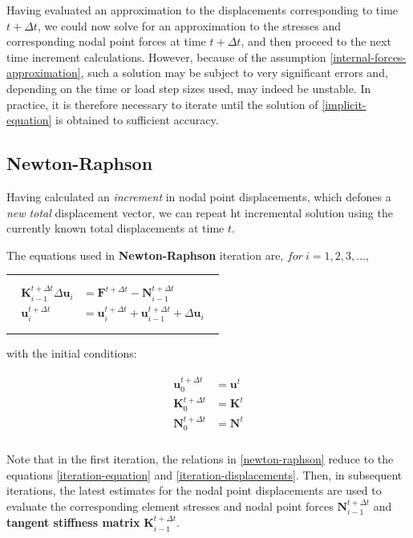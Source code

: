\documentclass[10pt,b5paper,titlepage]{book}
\newenvironment{bbox}[1][0.96]
{
    \begin{center}
        \begin{tabular}{|p{#1\textwidth}|}
            \hline\\
}
{
            \\\\\hline
        \end{tabular}
    \end{center}
}
\newenvironment{eqarray}
{
    \begin{eqnarray}
        \begin{aligned}
}
{
        \end{aligned}
    \end{eqnarray}
}
\begin{document}
Having evaluated an approximation to the displacements corresponding to
time $ t + \Delta t $, we could now solve for an approximation to the stresses and
corresponding nodal point forces at time $ t + \Delta t $, and then proceed to the
next time increment calculations. However, because of the assumption
\eqref{internal-forces-approximation}, such a solution may be subject to
very significant errors and, depending on the time or load step sizes used, may
indeed be unstable. In practice, it is therefore necessary to iterate until the
solution of \eqref{implicit-equation} is obtained to sufficient accuracy.


\subsection{Newton-Raphson}
Having calculated an \textit{increment} in nodal point displacements, which defones
a \textit{new total} displacement vector, we can repeat ht incremental solution
using the currently known total displacements at time $ t $.

The equations used in \textbf{Newton-Raphson} iteration are, $ for\ i = 1, 2, 3, \dots, $

\begin{bbox}
    \begin{eqarray}\label{newton-raphson}
        \mathbf{K}_{i-1}^{t + \Delta t} \Delta \mathbf{u}_i &=
        \mathbf{F}^{t + \Delta t} - \mathbf{N}_{i - 1}^{t + \Delta t} \\
        \mathbf{u}_{i}^{t+\Delta t} &=  \mathbf{u}_{i}^{t + \Delta t} +
        \mathbf{u}_{i-1}^{t+\Delta t} + \Delta \mathbf{u}_i
    \end{eqarray}
\end{bbox}

with the initial conditions:

\begin{eqarray}
    \mathbf{u}_{0}^{t + \Delta t} &= \mathbf{u}^t \\
    \mathbf{K}_{0}^{t + \Delta t} &= \mathbf{K}^t \\
    \mathbf{N}_{0}^{t + \Delta t} &= \mathbf{N}^t \\
\end{eqarray}

Note that in the first iteration, the relations in \eqref{newton-raphson}
reduce to the equations \eqref{iteration-equation} and \eqref{iteration-displacements}.
Then, in subsequent iterations, the latest estimates for the nodal point
displacements are used to evaluate the corresponding element stresses and
nodal point forces $ \mathbf{N}_{i-1}^{t + \Delta t} $ and
\textbf{tangent stiffness matrix} $ \mathbf{K}_{i-1}^{t + \Delta t} $.
\end{document}

